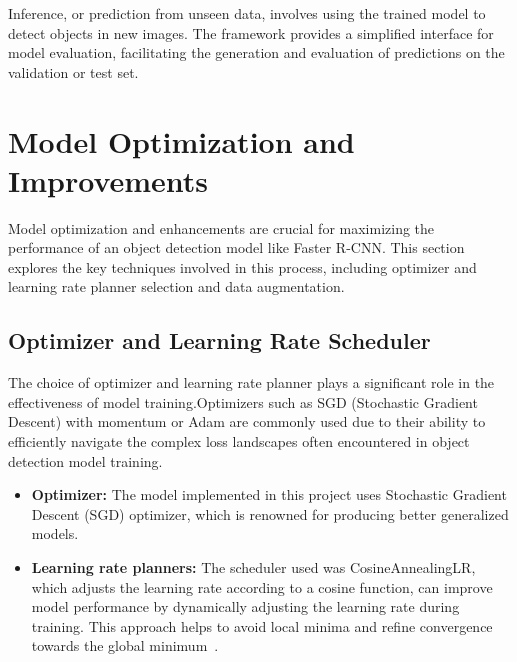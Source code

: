 \documentclass[12pt,oneside]{book} %
\begin{document}
Inference, or prediction from unseen data, involves using the trained model to
detect objects in new images. The framework provides a simplified interface for
model evaluation, facilitating the generation and evaluation of predictions on
the validation or test set.

\newpage
\section{Model Optimization and Improvements}
Model optimization and enhancements are crucial for maximizing the performance
of an object detection model like Faster R-CNN. This section explores the key
techniques involved in this process, including optimizer and learning rate
planner selection and data augmentation.

\subsection{Optimizer and Learning Rate Scheduler}
The choice of optimizer and learning rate planner plays a significant role in
the effectiveness of model training.Optimizers such as SGD (Stochastic Gradient
Descent) with momentum or Adam are commonly used due to their ability to
efficiently navigate the complex loss landscapes often encountered in object
detection model training.

\begin{itemize}
    \item \textbf{Optimizer:} The model implemented in this project uses Stochastic
          Gradient Descent (SGD) optimizer, which is renowned for producing better generalized
          models.
    \item \textbf{Learning rate planners:}  The scheduler used was CosineAnnealingLR, which
          adjusts the learning rate according to a cosine function, can improve model
          performance by dynamically adjusting the learning rate during training. This
          approach helps to avoid local minima and refine convergence towards the global
          minimum~\cite{cyclicallr}.
\end{itemize}
\end{document}
